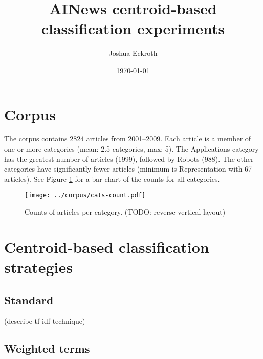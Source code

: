 \documentclass{article}
\title{AINews centroid-based classification experiments}
\author{Joshua Eckroth}
\date{\today}
\begin{document}
\maketitle


\section{Corpus}

The corpus contains 2824 articles from 2001--2009. Each article is a member of
one or more categories (mean: 2.5 categories, max: 5). The Applications
category has the greatest number of articles (1999), followed by Robots (988).
The other categories have significantly fewer articles (minimum is
Representation with 67 articles). See Figure \ref{fig:cats-counts} for
a bar-chart of the counts for all categories.

\begin{figure}[ht]
\begin{center}
\texttt{[image: ../corpus/cats-count.pdf]}
\caption{Counts of articles per category. (TODO: reverse vertical layout)}
\label{fig:cats-counts}
\end{center}
\end{figure}

\section{Centroid-based classification strategies}

\subsection{Standard}

(describe tf-idf technique)

\subsection{Weighted terms}
\end{document}
